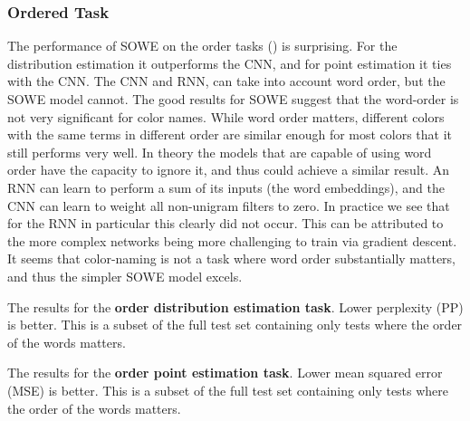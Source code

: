 \documentclass[11pt,a4paper]{article}
\begin{document}
\subsubsection{Ordered Task}
The performance of SOWE on the order tasks () is surprising.
For the distribution estimation it outperforms the CNN, and for point estimation it ties with the CNN.
The CNN and RNN, can take into account word order, but the SOWE model cannot.
The good results for SOWE suggest that the word-order is not very significant for color names.
While word order matters, different colors with the same terms in different order are similar enough for most colors that it still performs very well.
In theory the models that are capable of using word order have the capacity to ignore it, and thus could achieve a similar result.
An RNN can learn to perform a sum of its inputs (the word embeddings),
and the CNN can learn to weight all non-unigram filters to zero.
In practice we see that for the RNN in particular this clearly did not occur.
This can be attributed to the more complex networks being more challenging to train via gradient descent.
It seems that color-naming is not a task where word order substantially matters,
and thus the simpler SOWE model excels.




\begin{table}
	\caption{\label{tbl:distord} The results for the \textbf{order distribution estimation task}. Lower perplexity (PP) is better. This is a subset of the full test set containing only tests where the order of the words matters.}
\end{table}


\begin{table}
	\caption{\label{tbl:pointord} The results for the \textbf{order point estimation task}. Lower mean squared error (MSE) is better. This is a subset of the full test set containing only tests where the order of the words matters.}
\end{table}
\end{document}
